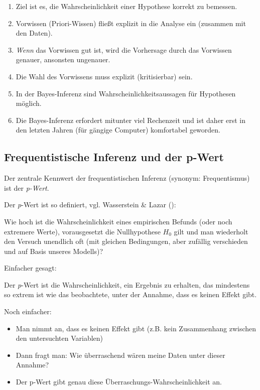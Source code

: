 \documentclass[
  ngerman,
  letterpaper,
  twoside,
  open=any]{scrbook}
\providecommand{\tightlist}{%
  \setlength{\itemsep}{0pt}\setlength{\parskip}{0pt}}\usepackage{longtable,booktabs,array}
\theoremstyle{definition}
\theoremstyle{plain}
\theoremstyle{definition}
\theoremstyle{definition}
\theoremstyle{remark}
\begin{document}
\begin{enumerate}
\def\labelenumi{\arabic{enumi}.}
\tightlist
\item
  Ziel ist es, die Wahrscheinlichkeit einer Hypothese korrekt zu
  bemessen.
\item
  Vorwissen (Priori-Wissen) fließt explizit in die Analyse ein (zusammen
  mit den Daten).
\item
  \emph{Wenn} das Vorwissen gut ist, wird die Vorhersage durch das
  Vorwissen genauer, ansonsten ungenauer.
\item
  Die Wahl des Vorwissens muss explizit (kritisierbar) sein.
\item
  In der Bayes-Inferenz sind Wahrscheinlichkeitsaussagen für Hypothesen
  möglich.
\item
  Die Bayes-Inferenz erfordert mitunter viel Rechenzeit und ist daher
  erst in den letzten Jahren (für gängige Computer) komfortabel
  geworden.
\end{enumerate}

\subsection{Frequentistische Inferenz und der
p-Wert}\label{frequentistische-inferenz-und-der-p-wert}

Der zentrale Kennwert der frequentistischen Inferenz (synonym:
Frequentismus) ist der \emph{p-Wert}.

Der \emph{p}-Wert ist so definiert, vgl. Wasserstein \& Lazar
():

\begin{displayquote}
Wie hoch ist die Wahrscheinlichkeit eines empirischen Befunds (oder noch
extremere Werte), vorausgesetzt die Nullhypothese \(H_0\) gilt und man
wiederholt den Versuch unendlich oft (mit gleichen Bedingungen, aber
zufällig verschieden und auf Basis unseres Modells)?
\end{displayquote}

Einfacher gesagt:

\begin{displayquote}
Der \emph{p}-Wert ist die Wahrscheinlichkeit, ein Ergebnis zu erhalten,
das mindestens so extrem ist wie das beobachtete, unter der Annahme,
dass es keinen Effekt gibt.
\end{displayquote}

Noch einfacher:

\begin{itemize}
\item
  Man nimmt an, dass es keinen Effekt gibt (z.B. kein Zusammenhang
  zwischen den untersuchten Variablen)
\item
  Dann fragt man: Wie überraschend wären meine Daten unter dieser
  Annahme?
\item
  Der p-Wert gibt genau diese Überraschungs-Wahrscheinlichkeit an.
\end{itemize}
\end{document}

